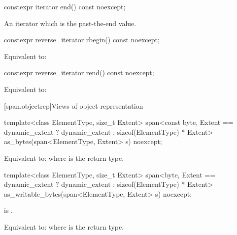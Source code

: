 %
\begin{itemdecl}
constexpr iterator end() const noexcept;
\end{itemdecl}

\begin{itemdescr}
\pnum
\returns
An iterator which is the past-the-end value.
\end{itemdescr}

%
\begin{itemdecl}
constexpr reverse_iterator rbegin() const noexcept;
\end{itemdecl}

\begin{itemdescr}
\pnum
\effects
Equivalent to: 
\end{itemdescr}

%
\begin{itemdecl}
constexpr reverse_iterator rend() const noexcept;
\end{itemdecl}

\begin{itemdescr}
\pnum
\effects
Equivalent to: 
\end{itemdescr}


[span.objectrep]{Views of object representation}

%
\begin{itemdecl}
template<class ElementType, size_t Extent>
  span<const byte, Extent == dynamic_extent ? dynamic_extent : sizeof(ElementType) * Extent>
    as_bytes(span<ElementType, Extent> s) noexcept;
\end{itemdecl}

\begin{itemdescr}
\pnum
\effects
Equivalent to: 
where  is the return type.
\end{itemdescr}

%
\begin{itemdecl}
template<class ElementType, size_t Extent>
  span<byte, Extent == dynamic_extent ? dynamic_extent : sizeof(ElementType) * Extent>
    as_writable_bytes(span<ElementType, Extent> s) noexcept;
\end{itemdecl}

\begin{itemdescr}
\pnum
\constraints
{} is .

\pnum
\effects
Equivalent to: 
where  is the return type.
\end{itemdescr}
